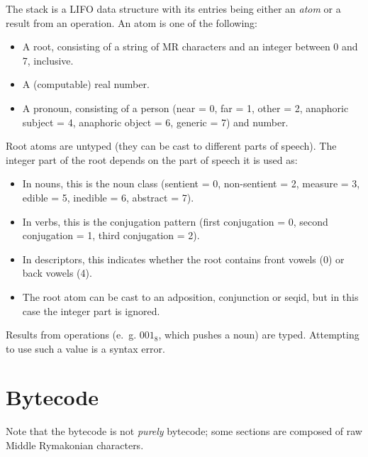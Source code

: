 \documentclass{book}
\newcommand{\lname}{Middle Rymakonian}
\begin{document}
The stack is a LIFO data structure with its entries being either an \emph{atom} or a result from an operation. An atom is one of the following:

\begin{itemize}
    \item A root, consisting of a string of MR characters and an integer between 0 and 7, inclusive.
    \item A (computable) real number.
    \item A pronoun, consisting of a person (near = 0, far = 1, other = 2, anaphoric subject = 4, anaphoric object = 6, generic = 7) and number.
\end{itemize}

Root atoms are untyped (they can be cast to different parts of speech). The integer part of the root depends on the part of speech it is used as:

\begin{itemize}
    \item In nouns, this is the noun class (sentient = 0, non-sentient = 2, measure = 3, edible = 5, inedible = 6, abstract = 7).
    \item In verbs, this is the conjugation pattern (first conjugation = 0, second conjugation = 1, third conjugation = 2).
    \item In descriptors, this indicates whether the root contains front vowels (0) or back vowels (4).
    \item The root atom can be cast to an adposition, conjunction or seqid, but in this case the integer part is ignored.
\end{itemize}

Results from operations (e.~g. $001_8$, which pushes a noun) are typed. Attempting to use such a value is a syntax error.

\section{Bytecode}

\newcommand{\push}{\text{push}}
\newcommand{\pop}{\text{pop}}

Note that the bytecode is not \emph{purely} bytecode; some sections are composed of raw \lname{} characters.
\end{document}
